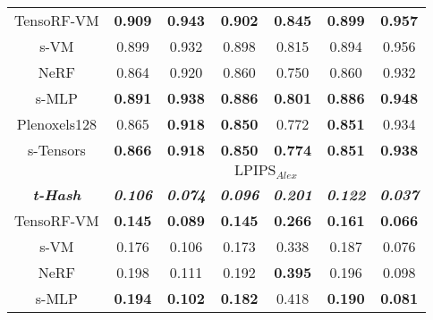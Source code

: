 \documentclass[letterpaper]{article} \usepackage{aaai23}  \usepackage{times}  \usepackage{helvet}  \usepackage{courier}  \usepackage[hyphens]{url}  \usepackage{graphicx} \urlstyle{rm} \def\UrlFont{\rm}  \usepackage{natbib}  \usepackage{caption} \frenchspacing  \setlength{\pdfpagewidth}{8.5in}  \setlength{\pdfpageheight}{11in}  \usepackage{multirow}
\begin{document}
\begin{table*}[t]
{\begin{tabular}{c|cccccc}
TensoRF-VM               & \textbf{0.909}          & \textbf{0.943}          & \textbf{0.902}          & \textbf{0.845}          & \textbf{0.899}          & \textbf{0.957}          \\
s-VM                     & 0.899                   & 0.932                   & 0.898                   & 0.815                   & 0.894                   & 0.956                   \\
NeRF                     & 0.864                   & 0.920                   & 0.860                   & 0.750                   & 0.860                   & 0.932                   \\
s-MLP                    & \textbf{0.891}          & \textbf{0.938}          & \textbf{0.886}          & \textbf{0.801}          & \textbf{0.886}          & \textbf{0.948}          \\
Plenoxels128             & 0.865                   & \textbf{0.918}          & \textbf{0.850}          & 0.772                   & \textbf{0.851}          & 0.934                   \\
s-Tensors                & \textbf{0.866}          & \textbf{0.918}          & \textbf{0.850}          & \textbf{0.774}          & \textbf{0.851}          & \textbf{0.938}          \\ \hline
                         & \multicolumn{6}{c}{$\text{LPIPS}_{Alex}$}                                                                                                                            \\ \hline
\textit{\textbf{t-Hash}} & \textit{\textbf{0.106}} & \textit{\textbf{0.074}} & \textit{\textbf{0.096}} & \textit{\textbf{0.201}} & \textit{\textbf{0.122}} & \textit{\textbf{0.037}} \\
TensoRF-VM               & \textbf{0.145}          & \textbf{0.089}          & \textbf{0.145}          & \textbf{0.266}          & \textbf{0.161}          & \textbf{0.066}          \\
s-VM                     & 0.176                   & 0.106                   & 0.173                   & 0.338                   & 0.187                   & 0.076                   \\
NeRF                     & 0.198                   & 0.111                   & 0.192                   & \textbf{0.395}          & 0.196                   & 0.098                   \\
s-MLP                    & \textbf{0.194}          & \textbf{0.102}          & \textbf{0.182}          & 0.418                   & \textbf{0.190}          & \textbf{0.081}          \\

\end{tabular}}
\end{table*}
\end{document}
